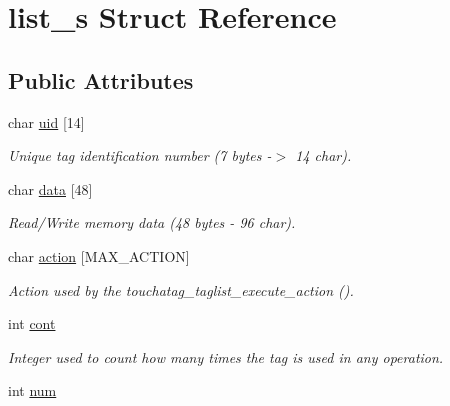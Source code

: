 \hypertarget{structlist__s}{
\section{list\_\-s Struct Reference}
\label{structlist__s}
}
\subsection*{Public Attributes}
\begin{DoxyCompactItemize}
\item 
\hypertarget{structlist__s_a198d92146c044dc0f7b83788ca9987f6}{
char \hyperlink{structlist__s_a198d92146c044dc0f7b83788ca9987f6}{uid} \mbox{[}14\mbox{]}}
\label{structlist__s_a198d92146c044dc0f7b83788ca9987f6}

\begin{DoxyCompactList}\small\item\em Unique tag identification number (7 bytes -\/$>$ 14 char). \item\end{DoxyCompactList}\item 
\hypertarget{structlist__s_afedd41427e468c2ed9c8fab4f7b92a3c}{
char \hyperlink{structlist__s_afedd41427e468c2ed9c8fab4f7b92a3c}{data} \mbox{[}48\mbox{]}}
\label{structlist__s_afedd41427e468c2ed9c8fab4f7b92a3c}

\begin{DoxyCompactList}\small\item\em Read/Write memory data (48 bytes -\/ 96 char). \item\end{DoxyCompactList}\item 
\hypertarget{structlist__s_a611b61610b819a39818cfabd447132f1}{
char \hyperlink{structlist__s_a611b61610b819a39818cfabd447132f1}{action} \mbox{[}MAX\_\-ACTION\mbox{]}}
\label{structlist__s_a611b61610b819a39818cfabd447132f1}

\begin{DoxyCompactList}\small\item\em Action used by the touchatag\_\-taglist\_\-execute\_\-action (). \item\end{DoxyCompactList}\item 
\hypertarget{structlist__s_a4acc518c276946f6da3a2134cb1dd810}{
int \hyperlink{structlist__s_a4acc518c276946f6da3a2134cb1dd810}{cont}}
\label{structlist__s_a4acc518c276946f6da3a2134cb1dd810}

\begin{DoxyCompactList}\small\item\em Integer used to count how many times the tag is used in any operation. \item\end{DoxyCompactList}\item 
\hypertarget{structlist__s_a6f5bf352a013122760a5672d8cc4bb15}{
int \hyperlink{structlist__s_a6f5bf352a013122760a5672d8cc4bb15}{num}}
\label{structlist__s_a6f5bf352a013122760a5672d8cc4bb15}


\end{DoxyCompactItemize}
